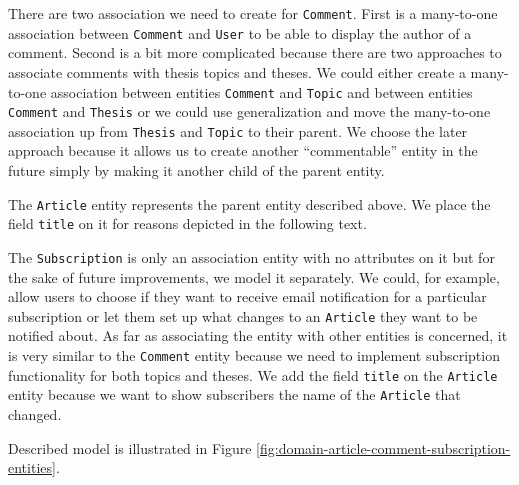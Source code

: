 There are two association we need to create for \texttt{Comment}. First is a many-to-one association between \texttt{Comment} and \texttt{User} to be able to display the author of a comment. Second is a bit more complicated because there are two approaches to associate comments with thesis topics and theses. We could either create a many-to-one association between entities \texttt{Comment} and \texttt{Topic} and between entities \texttt{Comment} and \texttt{Thesis} or we could use generalization and move the many-to-one association up from \texttt{Thesis} and \texttt{Topic} to their parent. We choose the later approach because it allows us to create another ``commentable'' entity in the future simply by making it another child of the parent entity.

The \texttt{Article} entity represents the parent entity described above. We place the field \texttt{title} on it for reasons depicted in the following text.

The \texttt{Subscription} is only an association entity with no attributes on it but for the sake of future improvements, we model it separately. We could, for example, allow users to choose if they want to receive email notification for a particular subscription or let them set up what changes to an \texttt{Article} they want to be notified about. As far as associating the entity with other entities is concerned, it is very similar to the \texttt{Comment} entity because we need to implement subscription functionality for both topics and theses. We add the field \texttt{title} on the \texttt{Article} entity because we want to show subscribers the name of the \texttt{Article} that changed.

Described model is illustrated in Figure \ref{fig:domain-article-comment-subscription-entities}.

